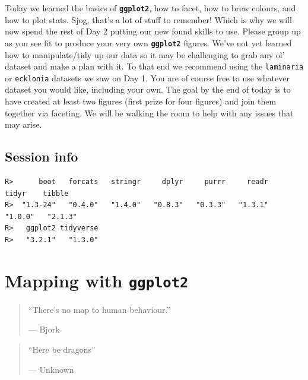 \documentclass[
]{book}
\newenvironment{Shaded}{\begin{snugshade}}{\end{snugshade}}
\newcommand{\KeywordTok}[1]{\textcolor[rgb]{0.13,0.29,0.53}{\textbf{#1}}}
\newcommand{\NormalTok}[1]{#1}
\newcommand{\OperatorTok}[1]{\textcolor[rgb]{0.81,0.36,0.00}{\textbf{#1}}}
\newcommand{\StringTok}[1]{\textcolor[rgb]{0.31,0.60,0.02}{#1}}
\begin{document}
Today we learned the basics of \textbf{\texttt{ggplot2}}, how to facet, how to brew colours, and how to plot stats. Sjog, that's a lot of stuff to remember! Which is why we will now spend the rest of Day 2 putting our new found skills to use. Please group up as you see fit to produce your very own \textbf{\texttt{ggplot2}} figures. We've not yet learned how to manipulate/tidy up our data so it may be challenging to grab any ol' dataset and make a plan with it. To that end we recommend using the \texttt{laminaria} or \texttt{ecklonia} datasets we saw on Day 1. You are of course free to use whatever dataset you would like, including your own. The goal by the end of today is to have created at least two figures (first prize for four figures) and join them together via faceting. We will be walking the room to help with any issues that may arise.

\hypertarget{session-info-5}{%
\section{Session info}\label{session-info-5}}

\begin{Shaded}
\end{Shaded}

\begin{verbatim}
R>      boot   forcats   stringr     dplyr     purrr     readr     tidyr    tibble 
R>  "1.3-24"   "0.4.0"   "1.4.0"   "0.8.3"   "0.3.3"   "1.3.1"   "1.0.0"   "2.1.3" 
R>   ggplot2 tidyverse 
R>   "3.2.1"   "1.3.0"
\end{verbatim}

\hypertarget{mapping}{%
\chapter{\texorpdfstring{Mapping with \textbf{\texttt{ggplot2}}}{Mapping with ggplot2}}\label{mapping}}

\begin{quote}
``There's no map to human behaviour.''

--- Bjork
\end{quote}

\begin{quote}
``Here be dragons''

--- Unknown
\end{quote}
\end{document}
